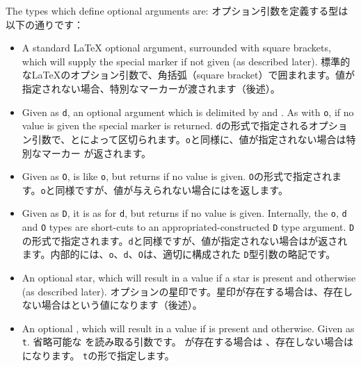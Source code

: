 \documentclass{ltxguide}
\newcommand\jpnewline{\vspace{3pt}\newline}
\begin{document}
The types which define optional arguments are:
\jpnewline
オプション引数を定義する型は以下の通りです：
\begin{itemize}
  \item[\texttt{o}] A standard \LaTeX{} optional argument, surrounded with square
    brackets, which will supply the special  marker if not given
    (as described later).
\jpnewline    
標準的な\LaTeX{}のオプション引数で、角括弧（square bracket）で囲まれます。値が指定されない場合、特別なマーカーが渡されます（後述）。 
  \item[\texttt{d}] Given as \texttt{d}, an optional
    argument which is delimited by  and . As with
    \texttt{o}, if no value is given the special marker  is
    returned.
 \jpnewline   
 \texttt{d}の形式で指定されるオプション引数で、とによって区切られます。\texttt{o}と同様に、値が指定されない場合は特別なマーカー が返されます。 
  \item[\texttt{O}] Given as \texttt{O}, is like \texttt{o}, but returns
     if no value is given.
\jpnewline    
 \texttt{O}の形式で指定されます。\texttt{o}と同様ですが、値が与えられない場合にはを返します。 
  \item[\texttt{D}] Given as \texttt{D}, it is
    as for \texttt{d}, but returns  if no value is given.
    Internally, the \texttt{o}, \texttt{d} and \texttt{O} types are
    short-cuts to an appropriated-constructed \texttt{D} type argument.
\jpnewline    
\texttt{D}の形式で指定されます。\texttt{d}と同様ですが、値が指定されない場合はが返されます。内部的には、\texttt{o}、\texttt{d}、\texttt{O}は、適切に構成された \texttt{D}型引数の略記です。
  \item[\texttt{s}] An optional star, which will result in a value
     if a star is present and 
    otherwise (as described later).
 \jpnewline   
オプションの星印です。星印が存在する場合は、存在しない場合はという値になります（後述）。 
  \item[\texttt{t}] An optional , which will result in a value
     if  is present and 
    otherwise. Given as \texttt{t}.
\jpnewline    
省略可能な  を読み取る引数です。 が存在する場合は 、存在しない場合はになります。 \texttt{t}の形で指定します。


\end{itemize}
\end{document}
